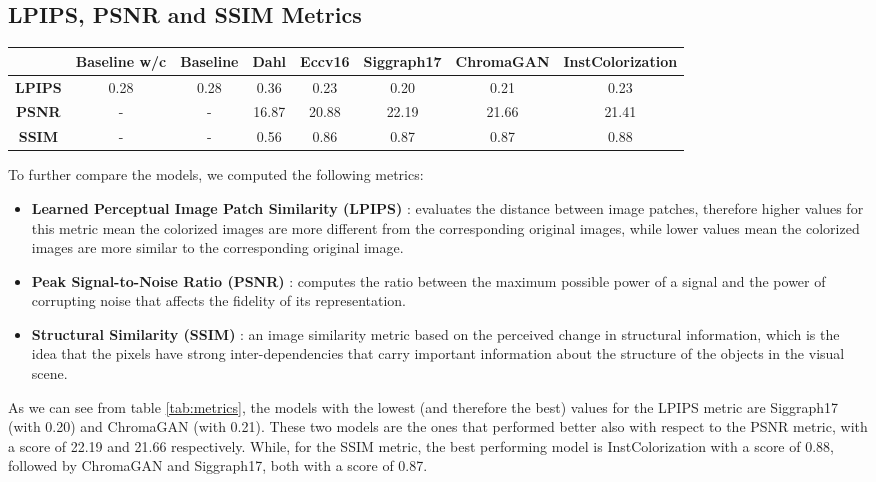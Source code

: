 \subsection{LPIPS, PSNR and SSIM Metrics}

\begin{table*}[ht]
	\begin{center}
		\begin{tabular}{c|ccccccc}
			& \textbf{Baseline w/c}&\textbf{Baseline} & \textbf{Dahl} & \textbf{Eccv16} & \textbf{Siggraph17} & \textbf{ChromaGAN} & \textbf{InstColorization}  \\
			\midrule
			\textbf{LPIPS} & 0.28 & 0.28 & 0.36 & 0.23 & 0.20 & 0.21 & 0.23 \\
			\midrule
			\textbf{PSNR} & - & - & 16.87 & 20.88 & 22.19 & 21.66 & 21.41 \\
			\midrule
			\textbf{SSIM} & - & - & 0.56 & 0.86 & 0.87 & 0.87 & 0.88 \\
		\end{tabular}
	\end{center}
	\caption{{\small  Summary of the metrics computed on different models.}}
	\label{tab:metrics}
\end{table*}

To further compare the models, we computed the following metrics:
\begin{itemize}
	\item \textbf {Learned Perceptual Image Patch Similarity (LPIPS)} \cite{lpips}: evaluates the distance between image patches, therefore higher values for this metric mean the colorized images are more different from the corresponding original images, while lower values mean the colorized images are more similar to the corresponding original image.
	\item \textbf {Peak Signal-to-Noise Ratio (PSNR)} \cite{psnr-ssim}: computes the ratio between the maximum possible power of a signal and the power of corrupting noise that affects the fidelity of its representation.
	\item \textbf {Structural Similarity (SSIM)} \cite{psnr-ssim}: an image similarity metric based on the perceived change in structural information, which is the idea that the pixels have strong inter-dependencies that carry important information about the structure of the objects in the visual scene.
\end{itemize}

As we can see from table \ref{tab:metrics}, the models with the lowest (and therefore the best) values for the
LPIPS metric are Siggraph17 (with 0.20) and ChromaGAN (with 0.21). These two models are the ones that performed better
also with respect to the PSNR metric, with a score of 22.19 and 21.66 respectively. While, for the SSIM metric, the
best performing model is InstColorization with a score of 0.88, followed by ChromaGAN and Siggraph17, both with a
score of 0.87.

